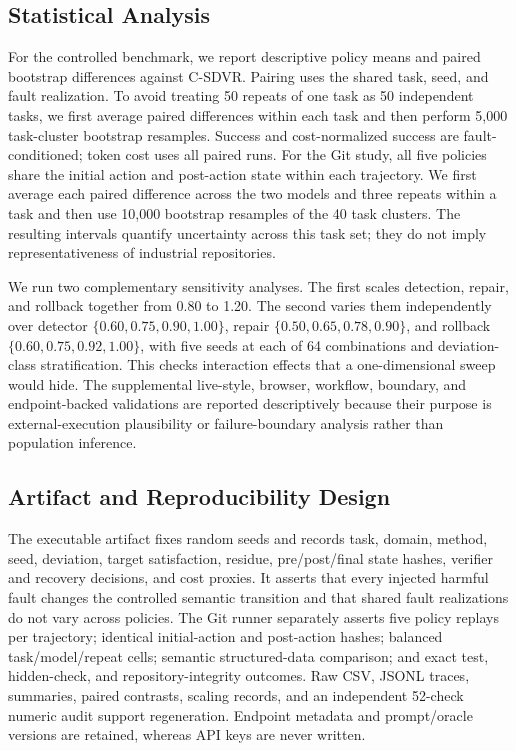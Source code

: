\documentclass[pdflatex,sn-apa]{sn-jnl}
\begin{document}
\subsection{Statistical Analysis}

For the controlled benchmark, we report descriptive policy means and paired bootstrap differences against C-SDVR. Pairing uses the shared task, seed, and fault realization. To avoid treating 50 repeats of one task as 50 independent tasks, we first average paired differences within each task and then perform 5,000 task-cluster bootstrap resamples. Success and cost-normalized success are fault-conditioned; token cost uses all paired runs. For the Git study, all five policies share the initial action and post-action state within each trajectory. We first average each paired difference across the two models and three repeats within a task and then use 10,000 bootstrap resamples of the 40 task clusters. The resulting intervals quantify uncertainty across this task set; they do not imply representativeness of industrial repositories.

We run two complementary sensitivity analyses. The first scales detection, repair, and rollback together from 0.80 to 1.20. The second varies them independently over detector $\{0.60,0.75,0.90,1.00\}$, repair $\{0.50,0.65,0.78,0.90\}$, and rollback $\{0.60,0.75,0.92,1.00\}$, with five seeds at each of 64 combinations and deviation-class stratification. This checks interaction effects that a one-dimensional sweep would hide. The supplemental live-style, browser, workflow, boundary, and endpoint-backed validations are reported descriptively because their purpose is external-execution plausibility or failure-boundary analysis rather than population inference.

\subsection{Artifact and Reproducibility Design}

The executable artifact fixes random seeds and records task, domain, method, seed, deviation, target satisfaction, residue, pre/post/final state hashes, verifier and recovery decisions, and cost proxies. It asserts that every injected harmful fault changes the controlled semantic transition and that shared fault realizations do not vary across policies. The Git runner separately asserts five policy replays per trajectory; identical initial-action and post-action hashes; balanced task/model/repeat cells; semantic structured-data comparison; and exact test, hidden-check, and repository-integrity outcomes. Raw CSV, JSONL traces, summaries, paired contrasts, scaling records, and an independent 52-check numeric audit support regeneration. Endpoint metadata and prompt/oracle versions are retained, whereas API keys are never written.
\end{document}
